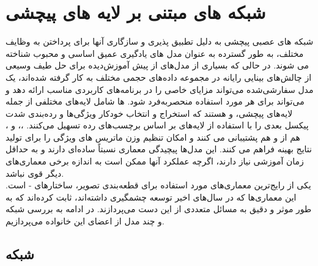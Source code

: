 \section{شبکه های مبتنی بر لایه های پیچشی}
شبکه های عصبی پیچشی به دلیل تطبیق پذیری و سازگاری آنها برای پرداختن به وظایف مختلف، به طور گسترده به عنوان مدل های یادگیری عمیق اساسی و محبوب شناخته می شوند. در حالی که بسیاری از مدل‌های  از پیش آموزش‌دیده برای حل طیف وسیعی از چالش‌های بینایی رایانه در مجموعه داده‌های حجمی مختلف به کار گرفته شده‌اند، یک مدل  سفارشی‌شده می‌تواند مزایای خاصی را در برنامه‌های کاربردی مناسب ارائه دهد و می‌تواند برای هر مورد استفاده منحصربه‌فرد  شود. ها شامل لایه‌های مختلفی از جمله لایه‌های  پیچشی، و  هستند که استخراج و انتخاب خودکار ویژگی‌ها و رده‌بندی شدت پیکسل بعدی را با استفاده از لایه‌های  بر اساس برچسب‌های رده تسهیل می‌کنند. ،، و ، هم از  و هم  پشتیبانی می کنند و امکان تنظیم وزن ماتریس های ویژگی را برای تولید نتایج بهینه فراهم می کنند. این مدل‌ها پیچیدگی معماری نسبتاً ساده‌ای دارند و به حداقل زمان آموزشی نیاز دارند، اگرچه عملکرد آنها ممکن است به اندازه برخی معماری‌های دیگر قوی نباشد\cite{das2022artificial}.
\\
یکی از رایج‌ترین معماری‌های مورد استفاده برای قطعه‌بندی تصویر، ساختارهای - است. این معماری‌ها که در سال‌های اخیر توسعه چشمگیری داشته‌اند، ثابت کرده‌اند که به طور موثر و دقیق به مسائل متعددی از این دست می‌پردازند. در ادامه به بررسی شبکه و چند مدل از اعضای این خانواده می‌پردازیم.

\subsection{ شبکه }

